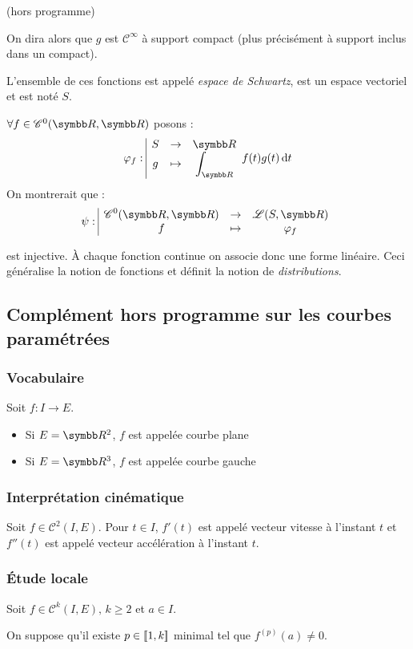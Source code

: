 \begin{remarque}
    (hors programme)
    
    On dira alors que $g$ est $\mathscr C^{\infty}$ à support compact (plus précisément à support inclus dans un compact).

    L'ensemble de ces fonctions est appelé \emph{espace de Schwartz}, est un espace vectoriel et est noté $S$.

    $\forall f \in \mathscr C^0(\R, \R)$ posons :
    \[\fonction {\varphi_f} S {\R} g {\int_{\R}} f(t)g(t) \dif t\]
    On montrerait que :
    \[\fonction {\psi} {\mathscr C^0(\R,\R)} {\mathscr L(S,\R)} f {\varphi_f}\]

    est injective.
    À chaque fonction continue on associe donc une forme linéaire.
    Ceci généralise la notion de fonctions et définit la notion de \emph{distributions}.
\end{remarque}

\subsection{Complément hors programme sur les courbes paramétrées}

\subsubsection{Vocabulaire}
Soit $f : I \to E$.
\begin{itemize}
    \item Si $E = \R^2$, $f$ est appelée courbe plane
    \item Si $E = \R^3$, $f$ est appelée courbe gauche
\end{itemize}

\subsubsection{Interprétation cinématique}
Soit $f \in \mathscr C^2(I, E)$. 
Pour $t \in I$, $f'(t)$ est appelé vecteur vitesse à l'instant $t$ et $f''(t)$ est appelé vecteur accélération à l'instant $t$.

\subsubsection{Étude locale}
Soit $f \in \mathscr C^k(I, E), \, k \geqslant 2$ et $a \in I$. 

On suppose qu'il existe $p \in [\![1, k]\!]$ minimal tel que $f^{(p)}(a) \neq 0$.

